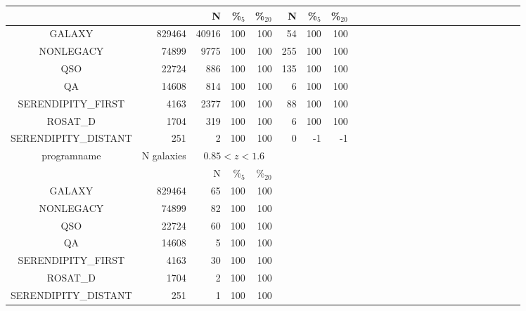 \documentclass[onecolumn]{aa}
\begin{document}
\begin{table*}
\begin{center}
\begin{tabular}{c r rrrr rrrr rrrrr rrrrr rrrrr}
       		&   & N & \%$_{5}$ & \%$_{20}$ & N & \%$_{5}$ & \%$_{20}$  \\
\hline
GALAXY              & 829464 & 40916 & 100 & 100 & 54  & 100 & 100 \\ 
NONLEGACY           & 74899  & 9775  & 100 & 100 & 255 & 100 & 100 \\ 
QSO                 & 22724  & 886   & 100 & 100 & 135 & 100 & 100 \\ 
QA                  & 14608  & 814   & 100 & 100 & 6   & 100 & 100 \\ 
SERENDIPITY\_FIRST   & 4163   & 2377  & 100 & 100 & 88  & 100 & 100 \\ 
ROSAT\_D             & 1704   & 319   & 100 & 100 & 6   & 100 & 100 \\ 
SERENDIPITY\_DISTANT & 251    & 2     & 100 & 100 & 0   & -1  & -1  \\
\hline
programname & N galaxies &   \multicolumn{3}{c}{$0.85<z<1.6$} \\
       		&   & N & \%$_{5}$ & \%$_{20}$ \\
\hline 
GALAXY              & 829464 & 65 & 100 & 100 \\ 
NONLEGACY           & 74899  & 82 & 100 & 100 \\
QSO                 & 22724  & 60 & 100 & 100 \\
QA                  & 14608  & 5  & 100 & 100 \\
SERENDIPITY\_FIRST   & 4163   & 30 & 100 & 100 \\
ROSAT\_D             & 1704   & 2  & 100 & 100 \\
SERENDIPITY\_DISTANT & 251    & 1  & 100 & 100 \\
\hline
\end{tabular}
\end{center}
\end{table*}
\end{document}
